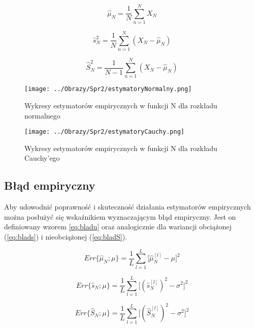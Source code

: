 \documentclass[12pt,a4paper]{article}
\begin{document}
\begin{equation}\label{eq:estymatorWartOczek}
\hat{\mu}_{N} = \frac{1}{N}\sum_{n=1}^{N}X_{N}
\end{equation}

\begin{equation}\label{eq:estymatorVarO}
\hat{s}^{2}_{N} = \frac{1}{N}\sum_{n=1}^{N}(X_{N}-\hat{\mu}_{N})
\end{equation}

\begin{equation}\label{eq:estymatorVarNO}
\hat{S}^{2}_{N} = \frac{1}{N-1}\sum_{n=1}^{N}(X_{N}-\hat{\mu}_{N})
\end{equation}

\begin{figure}[H]
\centering
\texttt{[image: ../Obrazy/Spr2/estymatoryNormalny.png]} 
\caption{Wykresy estymatorów empirycznych w funkcji N dla rozkładu normalnego}
\label{fig:estymatory}
\end{figure}

\begin{figure}[H]
\centering
\texttt{[image: ../Obrazy/Spr2/estymatoryCauchy.png]} 
\caption{Wykresy estymatorów empirycznych w funkcji N dla rozkładu Cauchy'ego}
\label{fig:estymatoryCauchy}
\end{figure}

\subsection{Błąd empiryczny}
Aby udowodnić poprawność i skuteczność działania estymatorów empirycznych można posłużyć się wskaźnikiem wyznaczającym błąd empiryczny.
Jest on definiowany wzorem \ref{eq:bladu} oraz analogicznie dla wariancji obciążonej (\ref{eq:blads}) i nieobciążonej (\ref{eq:bladS}).

\begin{equation}\label{eq:bladu}
Err\{\hat{\mu}_{N};\mu\}=\frac{1}{L}\sum\limits_{l=1}^{L}\Big[\hat{\mu}_{N}^{[l]}-\mu\Big]^{2}
\end{equation}

\begin{equation}\label{eq:blads}
Err\{\hat{s}_{N};\mu\}=\frac{1}{L}\sum\limits_{l=1}^{L}\Big[(\hat{s}_{N}^{[l]})^{2}-\sigma^2\Big]^{2}
\end{equation}

\begin{equation}\label{eq:bladS}
Err\{\hat{S}_{N};\mu\}=\frac{1}{L}\sum\limits_{l=1}^{L}\Big[(\hat{S}_{N}^{[l]})^{2}-\sigma^2\Big]^{2}
\end{equation}
\end{document}
